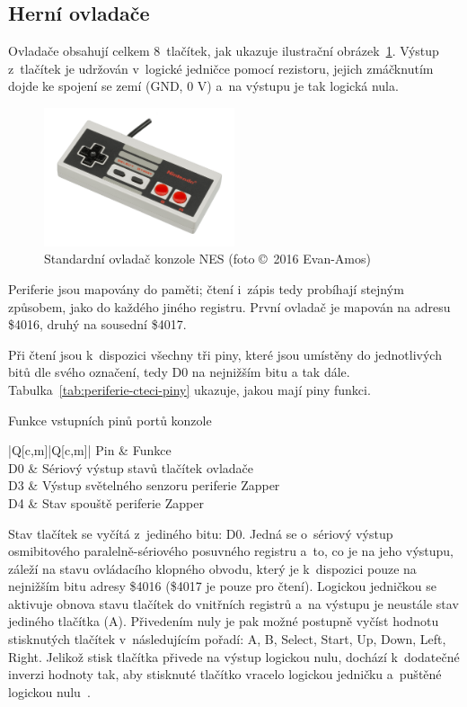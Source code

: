 \subsection{Herní ovladače}
Ovladače obsahují celkem 8~tlačítek, jak ukazuje ilustrační obrázek~\ref{fig:periferie-ovladac}. Výstup z~tlačítek je udržován v~logické jedničce pomocí rezistoru, jejich zmáčknutím dojde ke spojení se zemí (GND, 0 V) a~na výstupu je tak logická nula.

\begin{figure}[ht!]
	\centering
	\caption{Standardní ovladač konzole NES (foto \copyright~2016 Evan-Amos)}
	\label{fig:periferie-ovladac}
	\includegraphics[width=0.5\textwidth]{images/nes-ovladac.jpg}
\end{figure}

Periferie jsou mapovány do paměti; čtení i~zápis tedy probíhají stejným způsobem, jako do každého jiného registru. První ovladač je mapován na adresu \$4016, druhý na sousední \$4017.

Při čtení jsou k~dispozici všechny tři piny, které jsou umístěny do jednotlivých bitů dle svého označení, tedy D0 na nejnižším bitu a tak dále. Tabulka~\ref{tab:periferie-cteci-piny} ukazuje, jakou mají piny funkci.

\begin{table}[ht!]
	\centering
	\caption{Funkce vstupních pinů portů konzole}\label{tab:periferie-cteci-piny}
	\begin{tblr}{|Q[c,m]|Q[c,m]|}
		\hline
		Pin & Funkce \\
		\hline[2pt]
		D0 & Sériový výstup stavů tlačítek ovladače \\
		\hline
		D3 & Výstup světelného senzoru periferie Zapper \\
		\hline
		D4 & Stav spouště periferie Zapper \\ 
		\hline
	\end{tblr}
\end{table}

Stav tlačítek se vyčítá z~jediného bitu: D0. Jedná se o~sériový výstup osmibitového paralelně-sériového posuvného registru a~to, co je na jeho výstupu, záleží na stavu ovládacího klopného obvodu, který je k~dispozici pouze na nejnižším bitu adresy \$4016 (\$4017 je pouze pro čtení). Logickou jedničkou se aktivuje obnova stavu tlačítek do vnitřních registrů a~na výstupu je neustále stav jediného tlačítka (A). Přivedením nuly je pak možné postupně vyčíst hodnotu stisknutých tlačítek v~následujícím pořadí: A, B, Select, Start, Up, Down, Left, Right. Jelikož stisk tlačítka přivede na výstup logickou nulu, dochází k~dodatečné inverzi hodnoty tak, aby stisknuté tlačítko vracelo logickou jedničku a~puštěné logickou nulu~\cite{Nesdev:standard-controller}.

